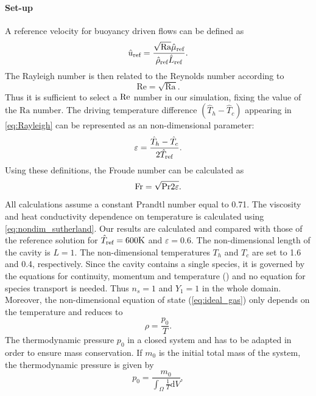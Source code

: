 \paragraph{Set-up}
A reference velocity for buoyancy driven flows can be defined as\cite{vierendeelsBenchmarkSolutionsNatural2003}
\begin{equation}
\RefVal{u} = \frac{\sqrt{\text{Ra}} \RefVal{\mu}}{\RefVal{\rho}\RefVal{L}}.
\end{equation} 
The Rayleigh number is then related to the Reynolds number according to
\begin{equation}
\text{Re} = \sqrt{\text{Ra}}.
\end{equation}
Thus it is sufficient to select a $\Reynolds$ number in our simulation, fixing the value of the $\text{Ra}$ number. The driving temperature difference $(\hat T_h - \hat T_c)$ appearing in \cref{eq:Rayleigh} can be represented as an non-dimensional parameter:
\begin{equation}\label{eq:nondimensionalTemperature}
\varepsilon = \frac{\hat T_h - \hat T_c}{2\RefVal{T}}.
\end{equation}
Using these definitions, the Froude number can be calculated as 
\begin{equation}
\Froude = \sqrt{\Prandtl 2 \varepsilon}.
\end{equation}
All calculations assume a constant Prandtl number equal to 0.71. The viscosity and heat conductivity  dependence on temperature is calculated using \cref{eq:nondim_sutherland}.
Our results are calculated and compared with those of the reference solution for $\RefVal{T} = 600\si{K}$  and $\varepsilon = 0.6$. The non-dimensional length of the cavity is $L=1$. The non-dimensional temperatures $T_h$ and $T_c$ are set to 1.6 and 0.4, respectively. 
Since the cavity contains a single species, it is governed by the equations for continuity, momentum and temperature () and no equation for species transport is needed. Thus $n_s = 1$ and  $Y_1 = 1$ in the whole domain.  Moreover, the non-dimensional equation of state (\cref{eq:ideal_gas}) only depends on the temperature and reduces to
\begin{equation}
\rho = \frac{p_0}{T}.
\end{equation}
The thermodynamic pressure $p_0$ in a closed system and has to be adapted in order to ensure mass conservation. If $m_0$ is the initial total mass of the system, the thermodynamic pressure is given by
\begin{equation}
p_0 = \frac{m_0}{\int_\Omega \frac{1}{T}\text{d}V}, \label{eq:p0Condition}
\end{equation}

